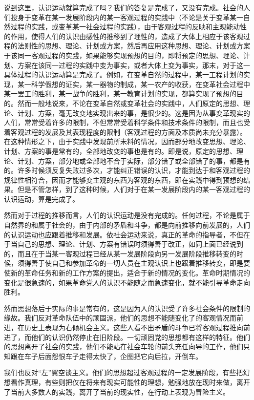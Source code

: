 \documentclass[UTF8, 12pt, a4paper]{ctexrep}
\begin{document}
说到这里，认识运动就算完成了吗？我们的答复是完成了，又没有完成。社会的人们投身于变革在某一发展阶段内的某一客观过程的实践中（不论是关于变革某一自然过程的实践，或变革某一社会过程的实践），由于客观过程的反映和主观能动性的作用，使得人们的认识由感性的推移到了理性的，造成了大体上相应于该客观过程的法则性的思想、理论、计划或方案，然后再应用这种思想、理论、计划或方案于该同一客观过程的实践，如果能够实现预想的目的，即将预定的思想、理论、计划、方案在该同一过程的实践中变为事实，或者大体上变为事实，那末，对于这一具体过程的认识运动算是完成了。例如，在变革自然的过程中，某一工程计划的实现，某一科学假想的证实，某一器物的制成，某一农产的收获，在变革社会过程中某一罢工的胜利，某一战争的胜利，某一教育计划的实现，都算实现了预想的目的。然而一般地说来，不论在变革自然或变革社会的实践中，人们原定的思想、理论、计划、方案，毫无改变地实现出来的事，是很少的。这是因为从事变革现实的人们，常常受着许多的限制，不但常常受着科学条件和技术条件的限制，而且也受着客观过程的发展及其表现程度的限制（客观过程的方面及本质尚未充分暴露）。在这种情形之下，由于实践中发现前所未料的情况，因而部分地改变思想、理论、计划、方案的事是常有的，全部地改变的事也是有的。即是说，原定的思想、理论、计划、方案，部分地或全部地不合于实际，部分错了或全部错了的事，都是有的。许多时候须反复失败过多次，才能纠正错误的认识，才能到达于和客观过程的规律性相符合，因而才能够变主观的东西为客观的东西，即在实践中得到预想的结果。但是不管怎样，到了这种时候，人们对于在某一发展阶段内的某一客观过程的认识运动，算是完成了。

然而对于过程的推移而言，人们的认识运动是没有完成的。任何过程，不论是属于自然界的和属于社会的，由于内部的矛盾和斗争，都是向前推移向前发展的，人们的认识运动也应跟着推移和发展。依社会运动来说，真正的革命的指导者，不但在于当自己的思想、理论、计划、方案有错误时须得善于改正，如同上面已经说到的，而且在于当某一客观过程已经从某一发展阶段向另一发展阶段推移转变的时候，须得善于使自己和参加革命的一切人员在主观认识上也跟着推移转变，即是要使新的革命任务和新的工作方案的提出，适合于新的情况的变化。革命时期情况的变化是很急速的，如果革命党人的认识不能随之而急速变化，就不能引导革命走向胜利。

然而思想落后于实际的事是常有的，这是因为人的认识受了许多社会条件的限制的缘故。我们反对革命队伍中的顽固派，他们的思想不能随变化了的客观情况而前进，在历史上表现为右倾机会主义。这些人看不出矛盾的斗争已将客观过程推向前进了，而他们的认识仍然停止在旧阶段。一切顽固党的思想都有这样的特征。他们的思想离开了社会的实践，他们不能站在社会车轮的前头充任向导的工作，他们只知跟在车子后面怨恨车子走得太快了，企图把它向后拉，开倒车。

我们也反对“左”翼空谈主义。他们的思想超过客观过程的一定发展阶段，有些把幻想看作真理，有些则把仅在将来有现实可能性的理想，勉强地放在现时来做，离开了当前大多数人的实践，离开了当前的现实性，在行动上表现为冒险主义。
\end{document}
